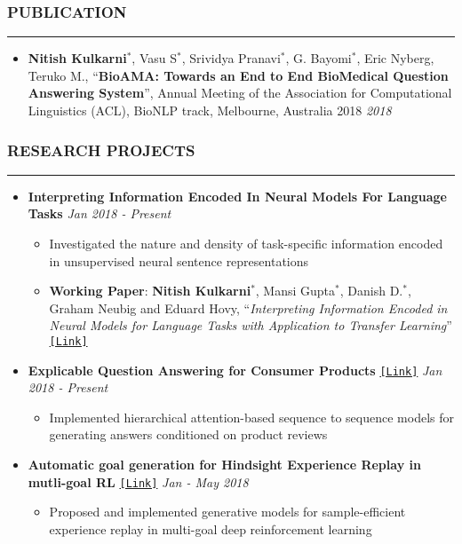 \documentclass[10pt,a4paper,English]{article}
\newcommand\roottitle[1]{\vspace{-4mm}\subsubsection*{\uppercase{#1}}\vspace{-0.3em}\nopagebreak[4]\hrule\vspace{4mm}}
\newcommand\itemyear[1]{\hfill \emph{\color{itemyear} #1}}
\newcommand\itemenv{\setlength\itemsep{0.5pt} \addtolength{\itemindent}{-5mm}\vspace{-1.5mm}}
\begin{document}
\roottitle{Publication}
\begin{itemize}[align=left, leftmargin=1em, itemindent=0mm, labelsep=0pt, labelwidth=1em]
    \vspace{-1.5mm}
    \item \textbf{Nitish Kulkarni}$^*$, Vasu S$^*$, Srividya Pranavi$^*$, G. Bayomi$^*$, Eric Nyberg, Teruko M., ``\textbf{BioAMA: Towards an End to End BioMedical Question Answering System}'', Annual Meeting of the Association for Computational Linguistics  (ACL), BioNLP track, Melbourne, Australia 2018 \itemyear{2018}
\end{itemize}

\roottitle{Research Projects}
\begin{itemize} \itemenv
    \item \textbf{Interpreting Information Encoded In Neural Models For Language Tasks} \itemyear{Jan 2018 - Present}
    \begin{itemize} \itemenv
        \item Investigated the nature and density of task-specific information encoded in unsupervised neural sentence representations
        \item \textbf{Working Paper}: \textbf{Nitish Kulkarni}$^*$, Mansi Gupta$^*$, Danish D.$^*$, Graham Neubig and Eduard Hovy, ``\textit{Interpreting Information Encoded in Neural Models for Language Tasks with Application to Transfer Learning}'' \href{https://drive.google.com/file/d/0B-tcIl8ikTixZnZRaVF0OWFKc2puR0dnOE9rSWlEZ2pPUjRF/view}{\texttt{[Link]}}
    \end{itemize}

    \item \textbf{Explicable Question Answering for Consumer Products} \href{https://drive.google.com/file/d/1vZldZ2ho2fDm7pu8WaiPKcUYhhFN7507/view}{\texttt{[Link]}} \itemyear{Jan 2018 - Present}
        \begin{itemize} \itemenv
            \item Implemented hierarchical attention-based sequence to sequence models for generating answers conditioned on product reviews
        \end{itemize}
    
    \item \textbf{Automatic goal generation for Hindsight Experience Replay in mutli-goal RL} \href{https://github.com/nitish-kulkarni/Automatic-Hindsight-Experience-Replay}{\texttt{[Link]}} \itemyear{Jan - May 2018}
        \begin{itemize} \itemenv
            \item Proposed and implemented generative models for sample-efficient experience replay in multi-goal deep reinforcement learning
        \end{itemize}


\end{itemize}
\end{document}
